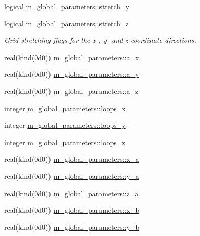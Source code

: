 \begin{DoxyCompactItemize}
\item 
logical \hyperlink{namespacem__global__parameters_acd02bb9d62d1e2a5a3185e12b0bdaea9}{m\+\_\+global\+\_\+parameters\+::stretch\+\_\+y}
\item 
logical \hyperlink{namespacem__global__parameters_aaeee716bda208dc0427196cdb8ad8cdf}{m\+\_\+global\+\_\+parameters\+::stretch\+\_\+z}
\begin{DoxyCompactList}\small\item\em Grid stretching flags for the x-\/, y-\/ and z-\/coordinate directions. \end{DoxyCompactList}\item 
real(kind(0d0)) \hyperlink{namespacem__global__parameters_aa0b506b1bb27c795ff1ca2049cd84b95}{m\+\_\+global\+\_\+parameters\+::a\+\_\+x}
\item 
real(kind(0d0)) \hyperlink{namespacem__global__parameters_a143fcefbf2bf4d1b296851d664c49b3a}{m\+\_\+global\+\_\+parameters\+::a\+\_\+y}
\item 
real(kind(0d0)) \hyperlink{namespacem__global__parameters_a8e0a3ebd94eeb22f50b48dff8a7e0cce}{m\+\_\+global\+\_\+parameters\+::a\+\_\+z}
\item 
integer \hyperlink{namespacem__global__parameters_a35f17d72a6c9e18aae51a5131d2c9303}{m\+\_\+global\+\_\+parameters\+::loops\+\_\+x}
\item 
integer \hyperlink{namespacem__global__parameters_af8c939272b6741337359fd99e419fba1}{m\+\_\+global\+\_\+parameters\+::loops\+\_\+y}
\item 
integer \hyperlink{namespacem__global__parameters_a5cfb837ca862adc01d2ba0dce83fbd17}{m\+\_\+global\+\_\+parameters\+::loops\+\_\+z}
\item 
real(kind(0d0)) \hyperlink{namespacem__global__parameters_a7d6df53840be063479492e0034b34b11}{m\+\_\+global\+\_\+parameters\+::x\+\_\+a}
\item 
real(kind(0d0)) \hyperlink{namespacem__global__parameters_ab19fa915c817b9b6697827d8ce059797}{m\+\_\+global\+\_\+parameters\+::y\+\_\+a}
\item 
real(kind(0d0)) \hyperlink{namespacem__global__parameters_a65b092136a85b466956efe77c639dc27}{m\+\_\+global\+\_\+parameters\+::z\+\_\+a}
\item 
real(kind(0d0)) \hyperlink{namespacem__global__parameters_ab43cefe0ef4c4b75b1d99842a8626393}{m\+\_\+global\+\_\+parameters\+::x\+\_\+b}
\item 
real(kind(0d0)) \hyperlink{namespacem__global__parameters_ae6deea785ef4dbdb572a8eb6f30b7c3a}{m\+\_\+global\+\_\+parameters\+::y\+\_\+b}

\end{DoxyCompactItemize}
